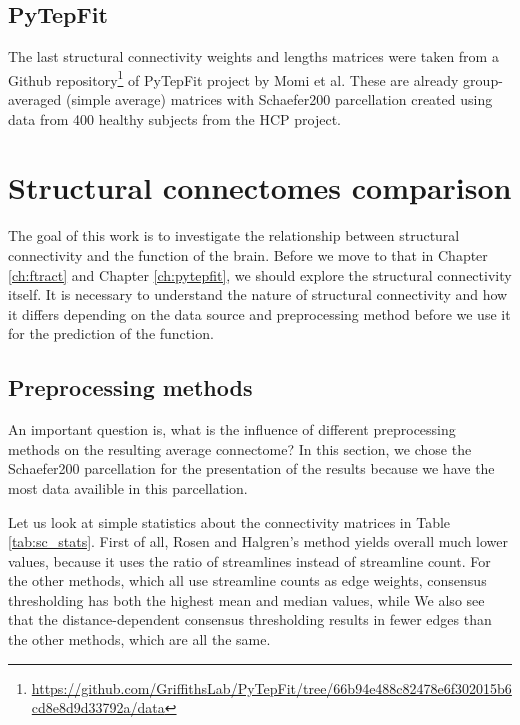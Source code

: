 \subsection{PyTepFit}

The last structural connectivity weights and lengths matrices were taken from a Github repository\footnote{\url{https://github.com/GriffithsLab/PyTepFit/tree/66b94e488c82478e6f302015b6cd8e8d9d33792a/data}} of PyTepFit project by Momi et al\cite{momi_tms-evoked_2023}. These are already group-averaged (simple average) matrices with Schaefer200 parcellation created using data from 400 healthy subjects from the HCP project. 

\section{Structural connectomes comparison}

The goal of this work is to investigate the relationship between structural connectivity and the function of the brain. Before we move to that in Chapter \ref{ch:ftract} and Chapter \ref{ch:pytepfit}, we should explore the structural connectivity itself. It is necessary to understand the nature of structural connectivity and how it differs depending on the data source and preprocessing method before we use it for the prediction of the function.

\subsection{Preprocessing methods}

An important question is, what is the influence of different preprocessing methods on the resulting average connectome? In this section, we chose the Schaefer200 parcellation for the presentation of the results because we have the most data availible in this parcellation. 

Let us look at simple statistics about the connectivity matrices in Table \ref{tab:sc_stats}. First of all, Rosen and Halgren's method yields overall much lower values, because it uses the ratio of streamlines instead of streamline count. For the other methods, which all use streamline counts as edge weights, consensus thresholding has both the highest mean and median values, while  We also see that the distance-dependent consensus thresholding results in fewer edges than the other methods, which are all the same. 


